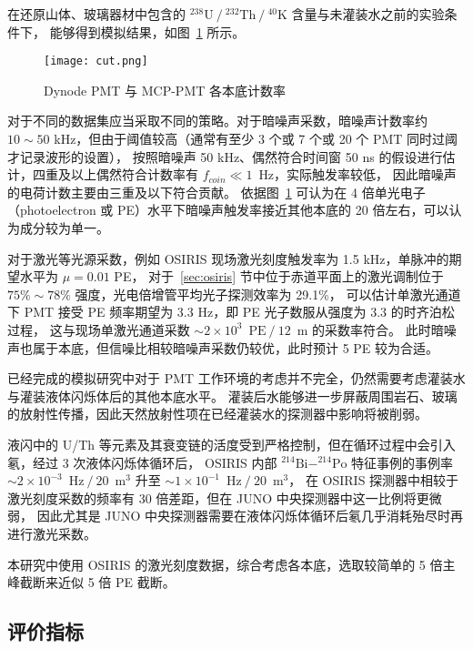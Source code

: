 在还原山体、玻璃器材中包含的 $^{238}\text{U}\ /\ ^{232}\text{Th}\ /\ ^{40}\text{K}$ 含量与未灌装水之前的实验条件下，
能够得到模拟结果，如图~\ref{fig:cut} 所示。

\begin{figure}
    \centering
    \texttt{[image: cut.png]}
    \caption{Dynode PMT 与 MCP-PMT 各本底计数率\cite{zhangStudy20inchPMTs2022}}
    \label{fig:cut}
\end{figure}

对于不同的数据集应当采取不同的策略。对于暗噪声采数，暗噪声计数率约 $10\sim50$ kHz，但由于阈值较高（通常有至少 3 个或 7 个或 20 个 PMT 同时过阈才记录波形的设置），
按照暗噪声 50 kHz、偶然符合时间窗 50 ns 的假设进行估计，四重及以上偶然符合计数率有 $f_{coin}\ll1\enspace\text{Hz}$，实际触发率较低，
因此暗噪声的电荷计数主要由三重及以下符合贡献。
依据图~\ref{fig:cut} 可认为在 4 倍单光电子（photoelectron 或 PE）水平下暗噪声触发率接近其他本底的 20 倍左右，可以认为成分较为单一。

对于激光等光源采数，例如 OSIRIS 现场激光刻度触发率为 1.5 kHz，单脉冲的期望水平为 $\mu=0.01$ PE\cite{junocollaborationDesignSensitivityJUNO2021}，
对于~\ref{sec:osiris} 节中位于赤道平面上的激光调制位于 $75\%\sim78\%$ 强度，光电倍增管平均光子探测效率为 29.1\%\cite{JUNOPhysicsDetector2022}，
可以估计单激光通道下 PMT 接受 PE 频率期望为 3.3 Hz，即 PE 光子数服从强度为 3.3 的时齐泊松过程，
这与现场单激光通道采数 $\sim2\times10^{3}\enspace\text{PE}\ /\ 12\enspace\text{m}$ 的采数率符合。
此时暗噪声也属于本底，但信噪比相较暗噪声采数仍较优，此时预计 5 PE 较为合适。

已经完成的模拟研究中对于 PMT 工作环境的考虑并不完全，仍然需要考虑灌装水与灌装液体闪烁体后的其他本底水平。
灌装后水能够进一步屏蔽周围岩石、玻璃的放射性传播，因此天然放射性项在已经灌装水的探测器中影响将被削弱。

液闪中的 U/Th 等元素及其衰变链的活度受到严格控制，但在循环过程中会引入氡，经过 3 次液体闪烁体循环后，
OSIRIS 内部 $^{214}\text{Bi}-^{214}\text{Po}$ 特征事例的事例率 $\sim2\times10^{-3}\enspace\text{Hz}\ /\ 20\enspace\text{m}^3$ 
升至 $\sim1\times10^{-1}\enspace\text{Hz}\ /\ 20\enspace\text{m}^3$，
在 OSIRIS 探测器中相较于激光刻度采数的频率有 30 倍差距，但在 JUNO 中央探测器中这一比例将更微弱，
因此尤其是 JUNO 中央探测器需要在液体闪烁体循环后氡几乎消耗殆尽时再进行激光采数。

本研究中使用 OSIRIS 的激光刻度数据，综合考虑各本底，选取较简单的 5 倍主峰截断来近似 5 倍 PE 截断。

\subsection{评价指标}\label{sec:criterion}

